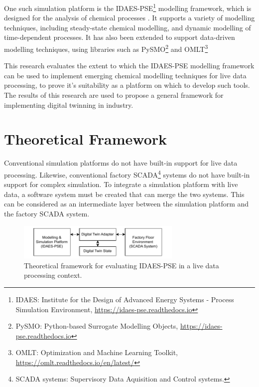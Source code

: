 \documentclass[12pt]{article}
\begin{document}
One such simulation platform is the IDAES-PSE\footnote{IDAES: Institute for the Design of Advanced Energy Systems - Process Simulation Environment, \href{https://idaes-pse.readthedocs.io}{https://idaes-pse.readthedocs.io}} modelling framework, which is designed for the analysis of chemical processes \cite{lee2021idaes}. It supports a variety of modelling techniques, including steady-state chemical modelling, and dynamic modelling of time-dependent processes. 
It has also been extended to support data-driven modelling techniques, using libraries such as PySMO\footnote{PySMO: Python-based Surrogate Modelling Objects, \href{https://idaes-pse.readthedocs.io/en/stable/explanations/modeling_extensions/surrogate/api/pysmo/index.html}{https://idaes-pse.readthedocs.io}} and OMLT\footnote{OMLT: Optimization and Machine Learning Toolkit, \href{https://omlt.readthedocs.io/en/latest/}{https://omlt.readthedocs.io/en/latest/}} \cite{cecconOMLTOptimizationMachine2022} 


This research evaluates the extent to which the IDAES-PSE modelling framework can be used to implement emerging chemical modelling techniques for live data processing, to prove it's suitability as a platform on which to develop such tools.
The results of this research are used to propose a general framework for implementing digital twinning in industry.


\section{Theoretical Framework}\label{sec:theoretical_framework}

Conventional simulation platforms do not have built-in support for live data processing. Likewise, conventional factory SCADA\footnote{SCADA systems: Supervisory Data Aquisition and Control systems.} systems do not have built-in support for complex simulation. To integrate a simulation platform with live data, a software system must be created that can merge the two systems. This can be considered as an intermediate layer between the simulation platform and the factory SCADA system.


\begin{figure}[h]
    \centering
    \includegraphics[width=0.7\textwidth]{research_journal_framework_simple.pdf}
    \caption{Theoretical framework for evaluating IDAES-PSE in a live data processing context.}
    \label{fig:theoretical_framework}
\end{figure}
\end{document}
